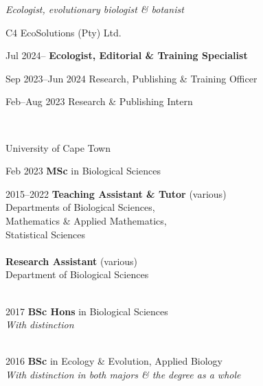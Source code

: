 \documentclass[12pt]{article}
\begin{document}



\bigskip

\begin{center}
  \textit{Ecologist, evolutionary biologist \& botanist}
\end{center}

C4 EcoSolutions (Pty) Ltd.

Jul 2024-- \hspace{5.15em} \textbf{Ecologist, Editorial \& Training Specialist}

Sep 2023--Jun 2024 \hspace{0.5em} Research, Publishing \& Training Officer

Feb--Aug 2023 \hspace{2.75em} Research \& Publishing Intern

\

University of Cape Town

Feb 2023   \hspace{5.1em} \textbf{MSc} in Biological Sciences

2015--2022 \hspace{1.5em} \textbf{Teaching Assistant \& Tutor} (various) \\
           \hspace{6.75em} Departments of Biological Sciences, \\
                            \hspace{13em} Mathematics \& Applied Mathematics, \\
                            \hspace{13em} Statistical Sciences \\
           \ \\
           \hspace{6.75em} \textbf{Research Assistant} (various) \\
           \hspace{6.75em} Department of Biological Sciences \\
\

2017       \hspace{4.25em} \textbf{BSc Hons} in Biological Sciences \\
           \hspace{6.75em} \textit{With distinction} \\
\

2016       \hspace{4.25em} \textbf{BSc} in Ecology \& Evolution, Applied Biology \\
           \hspace{6.75em} \textit{With distinction in both majors \& the degree as a whole} \\
\
\end{document}

